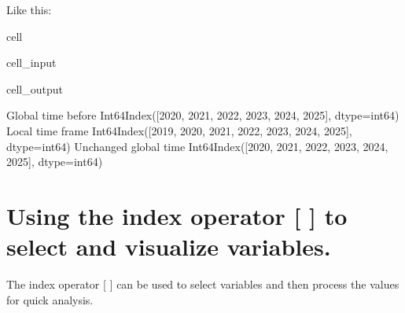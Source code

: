 \documentclass[letterpaper,10pt,english]{jupyterBook}
\begin{document}
\sphinxAtStartPar
Like this:

\begin{sphinxuseclass}{cell}\begin{sphinxVerbatimInput}

\begin{sphinxuseclass}{cell_input}
\begin{sphinxVerbatim}[commandchars=\\\{\}]
  
\end{sphinxVerbatim}

\end{sphinxuseclass}\end{sphinxVerbatimInput}
\begin{sphinxVerbatimOutput}

\begin{sphinxuseclass}{cell_output}
\begin{sphinxVerbatim}[commandchars=\\\{\}]
Global time  before   Int64Index([2020, 2021, 2022, 2023, 2024, 2025], dtype=\PYGZsq{}int64\PYGZsq{})
Local time frame      Int64Index([2019, 2020, 2021, 2022, 2023, 2024, 2025], dtype=\PYGZsq{}int64\PYGZsq{})
Unchanged global time Int64Index([2020, 2021, 2022, 2023, 2024, 2025], dtype=\PYGZsq{}int64\PYGZsq{})
\end{sphinxVerbatim}

\end{sphinxuseclass}\end{sphinxVerbatimOutput}

\end{sphinxuseclass}

\section{Using the index operator {[} {]} to select and visualize variables.}
\label{\detokenize{content/notebooks/modelflow_features:using-the-index-operator-to-select-and-visualize-variables}}\label{\detokenize{content/notebooks/modelflow_features:index-operator}}
\sphinxAtStartPar
The index operator {[} {]} can be used to select variables and then process the values for quick analysis.
\end{document}
